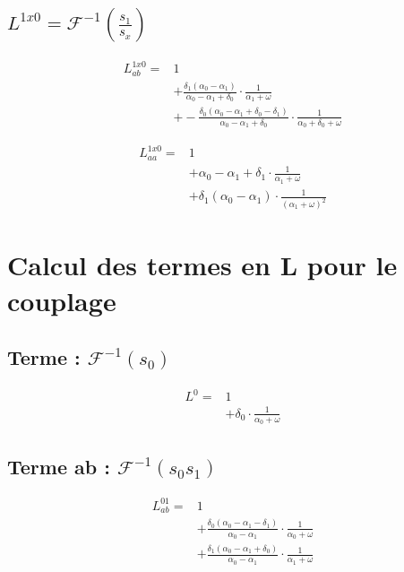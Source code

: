 \documentclass[a4paper,10pt]{article}
\begin{document}
\subsection{$L^{1x0} = \mathcal{F}^{-1}(\frac{s_{1}}{s_{x}})$}


\begin{align*}
 L^{1x0}_{ab}  =&1\\
&+ \frac{\delta_{1} \left(\alpha_{0} - \alpha_{1}\right)}{\alpha_{0} - \alpha_{1} + \delta_{0}} \cdot \frac{1}{\alpha_{1} + \omega}\\
&+ - \frac{\delta_{0} \left(\alpha_{0} - \alpha_{1} + \delta_{0} - \delta_{1}\right)}{\alpha_{0} - \alpha_{1} + \delta_{0}} \cdot \frac{1}{\alpha_{0} + \delta_{0} + \omega}
\end{align*}

\begin{align*}
 L^{1x0}_{aa}  =&1\\
&+ \alpha_{0} - \alpha_{1} + \delta_{1} \cdot \frac{1}{\alpha_{1} + \omega}\\
&+ \delta_{1} \left(\alpha_{0} - \alpha_{1}\right) \cdot \frac{1}{\left(\alpha_{1} + \omega\right)^{2}}
\end{align*}
\section{Calcul des termes en L pour le couplage}
\subsection{Terme : $\mathcal{F}^{-1}(s_{0})$}

\begin{align*}
 L^{0}  =&1\\
&+ \delta_{0} \cdot \frac{1}{\alpha_{0} + \omega}
\end{align*}
\subsection{Terme  ab : $\mathcal{F}^{-1}(s_{0}s_{1})$}

\begin{align*}
 L^{01}_{ab}  =&1\\
&+ \frac{\delta_{0} \left(\alpha_{0} - \alpha_{1} - \delta_{1}\right)}{\alpha_{0} - \alpha_{1}} \cdot \frac{1}{\alpha_{0} + \omega}\\
&+ \frac{\delta_{1} \left(\alpha_{0} - \alpha_{1} + \delta_{0}\right)}{\alpha_{0} - \alpha_{1}} \cdot \frac{1}{\alpha_{1} + \omega}
\end{align*}
\end{document}
